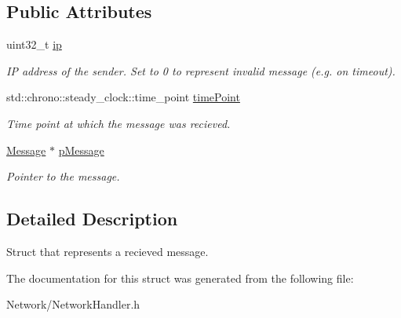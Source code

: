 \subsection*{Public Attributes}
\begin{DoxyCompactItemize}
\item 
\mbox{\label{structNetworkHandler_1_1RecievedMessage_a6f01f4a042b9f5a4cd40d441e0e29d48}} 
uint32\+\_\+t \mbox{\hyperlink{structNetworkHandler_1_1RecievedMessage_a6f01f4a042b9f5a4cd40d441e0e29d48}{ip}}
\begin{DoxyCompactList}\small\item\em IP address of the sender. Set to 0 to represent invalid message (e.\+g. on timeout). \end{DoxyCompactList}\item 
\mbox{\label{structNetworkHandler_1_1RecievedMessage_a0ce3474866ebd9fefaeba2cf901959e2}} 
std\+::chrono\+::steady\+\_\+clock\+::time\+\_\+point \mbox{\hyperlink{structNetworkHandler_1_1RecievedMessage_a0ce3474866ebd9fefaeba2cf901959e2}{time\+Point}}
\begin{DoxyCompactList}\small\item\em Time point at which the message was recieved. \end{DoxyCompactList}\item 
\mbox{\label{structNetworkHandler_1_1RecievedMessage_a3407eb8d41737f5ab7fbf73fa6813342}} 
\mbox{\hyperlink{structNetworkHandler_1_1Message}{Message}} $\ast$ \mbox{\hyperlink{structNetworkHandler_1_1RecievedMessage_a3407eb8d41737f5ab7fbf73fa6813342}{p\+Message}}
\begin{DoxyCompactList}\small\item\em Pointer to the message. \end{DoxyCompactList}\end{DoxyCompactItemize}


\subsection{Detailed Description}
Struct that represents a recieved message. 

The documentation for this struct was generated from the following file\+:\begin{DoxyCompactItemize}
\item 
Network/Network\+Handler.\+h\end{DoxyCompactItemize}
